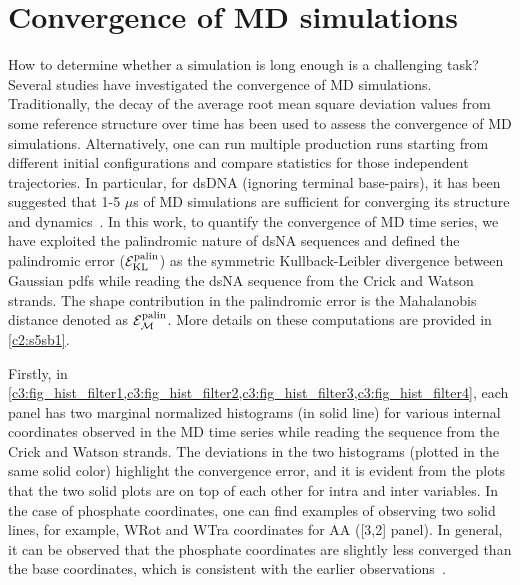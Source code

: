\section{Convergence of MD simulations}\label{c3:s5}
How to determine whether a simulation is long enough is a 
challenging task? 
Several studies have investigated the convergence of MD simulations.
Traditionally, the decay of the average root mean square deviation values from some reference structure over time has been used to assess the convergence of MD simulations.
Alternatively, one can run multiple production runs starting from different initial configurations and compare statistics for those independent trajectories.
In particular, for dsDNA (ignoring terminal base-pairs), it has been suggested that 
1-5 $\mu$s of MD simulations are sufficient for converging its structure and dynamics~\cite{galindo2015convergence}. 
In this work, to quantify the convergence of MD time series, we have exploited the palindromic nature of dsNA sequences and defined the palindromic error (${\mathcal E}_{\text{KL}}^{\text{palin}}$) as the symmetric Kullback-Leibler divergence between Gaussian pdfs while reading the dsNA sequence from the Crick and Watson strands. 
The shape contribution in the palindromic error is the Mahalanobis distance denoted as ${\mathcal E}_{\mathcal{M}}^{\text{palin}}$. 
More details on these computations are provided in \cref{c2:s5sb1}.   

Firstly, in \cref{c3:fig_hist_filter1,c3:fig_hist_filter2,c3:fig_hist_filter3,c3:fig_hist_filter4}, each panel has two marginal normalized histograms (in solid line) for various internal coordinates observed in the MD time series while reading the sequence from the Crick and Watson strands.
The deviations in the two histograms (plotted in the same solid color) highlight the convergence error, and it is evident from the plots that the two solid plots are on top of each other for intra and inter variables. In the case of phosphate coordinates, one can find examples of observing two solid lines, for example, WRot and WTra coordinates for AA ([3,2] panel). In general, it can be observed that the phosphate coordinates are slightly less converged than the base coordinates, which is consistent with the earlier observations~\cite{patelithesis}. \clearpage

